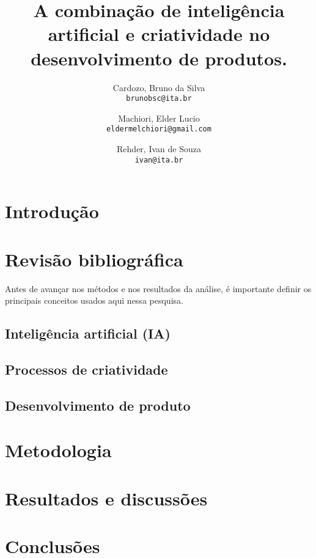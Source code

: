 \documentclass[a4paper, 10pt, dvipsnames]{article}
\title{A combinação de inteligência artificial e criatividade no desenvolvimento de produtos.}
\author{
  Cardozo, Bruno da Silva\\
  \texttt{brunobsc@ita.br}
  \and
  Machiori, Elder Lucio\\
  \texttt{eldermelchiori@gmail.com}
  \and
  Rehder, Ivan de Souza\\
  \texttt{ivan@ita.br}
}
\begin{document}
\maketitle

\begin{abstract}

\end{abstract}

\section{Introdução}


\section{Revisão bibliográfica}

Antes de avançar nos métodos e nos resultados da análise, é importante definir os principais conceitos usados aqui nessa pesquisa.

\subsection*{Inteligência artificial (IA)}


\subsection*{Processos de criatividade}


\subsection*{Desenvolvimento de produto}


\section{Metodologia}


\section{Resultados e discussões}


\section{Conclusões}


%

\end{document}
